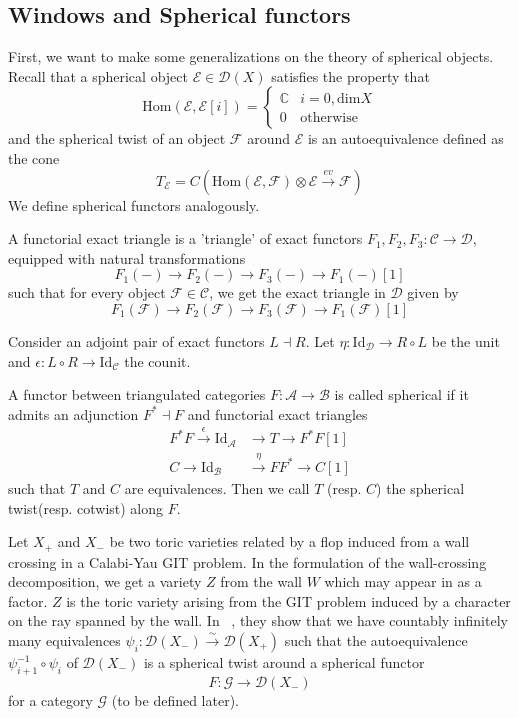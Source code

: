 \subsection{Windows and Spherical functors}

First, we want to make some generalizations on the theory of spherical objects. Recall that a spherical object $\mathcal{E} \in \mathcal{D}(X)$ satisfies the property that $$\mathrm{Hom}(\mathcal{E}, \mathcal{E}[i])= \begin{cases}
\mathbb{C} & i=0,\mathrm{dim}X  \\
0 & \text{otherwise}
\end{cases}$$
and the spherical twist of an object $\mathcal{F}$ around $\mathcal{E}$ is an autoequivalence defined as the cone $$T_\mathcal{E} = C(\mathrm{Hom}(\mathcal{E},\mathcal{F})\otimes \mathcal{E}\xrightarrow{ev} \mathcal{F})$$
We define spherical functors analogously.


\begin{definition}{}{}
	A functorial exact triangle is a 'triangle' of exact functors $F_{1}, F_{2}, F_{3} : \mathcal{C}\to \mathcal{D}$,    equipped with natural transformations $$
F_{1}(-)\to F_{2}(-)\to F_{3}(-)\to F_{1}(-)[1]
$$ such that for every object $\mathcal{F}\in \mathcal{C}$,   we get the exact triangle in $\mathcal{D}$ given by $$
F_{1}(\mathcal{F})\to F_{2}(\mathcal{F})\to F_{3}(\mathcal{F})\to F_{1}(\mathcal{F})[1]
$$
\end{definition}

Consider an adjoint pair of exact functors $L \dashv R$. Let $\eta : \mathrm{Id}_\mathcal{D}\to R\circ L$ be the unit and $\epsilon : L\circ R \to \mathrm{Id}_\mathcal{C}$ the counit. 

\begin{definition}{}{}
A functor between triangulated categories $F: \mathcal{A}\to \mathcal{B}$ is called spherical if it admits an adjunction $F^{*}\dashv F$ and  functorial exact triangles 
\begin{align*}
F^{*}F \xrightarrow{\epsilon} \mathrm{Id}_\mathcal{A}&\to T \to F^{*}F [1] \\
C\to \mathrm{Id}_\mathcal{B}&\xrightarrow{\eta} F F^{*}\to C[1]
\end{align*} such that $T$ and $C$ are equivalences. Then we call $T$ (resp. $C$) the spherical twist(resp. cotwist) along $F$. 
\end{definition}

Let $X_+$ and $X_-$ be two toric varieties related by a flop induced from a wall crossing in a Calabi-Yau GIT problem. In the formulation of the wall-crossing decomposition, we get a variety $Z$ from the wall $W$ which may appear in as a factor. $Z$ is the toric variety arising from the GIT problem induced by a character on the ray spanned by the wall. In ~\cite*{halpernleistner2016autoequivalences}, they show that we have countably infinitely many equivalences $\psi_{i}: \mathcal{D}(X_{-})\xrightarrow{\sim} \mathcal{D}(X_{+})$  such that the autoequivalence $\psi_{i+1}^{-1}\circ \psi_i$ of $\mathcal{D}(X_{-})$ is a spherical twist around a spherical functor $$F : \mathcal{G}\to \mathcal{D}(X_{-})$$ for a category $\mathcal{G}$ (to be defined later).


